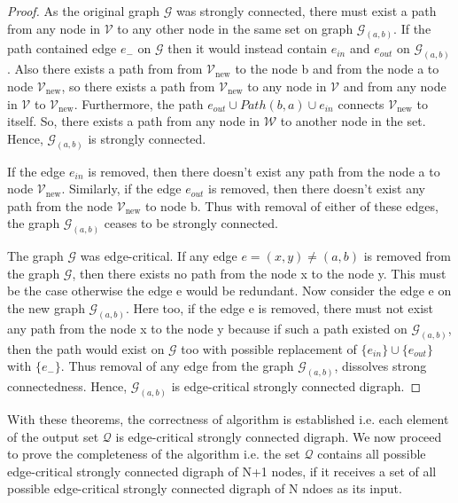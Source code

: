 \documentclass[runningheads]{llncs}
\begin{document}
\begin{proof}
As the original graph $\mathcal{G}$ was strongly connected, there must exist a path from any node in $\mathcal{V}$ to any other node in the same set on graph $\mathcal{G}_{(a, b)}$. If the path contained edge $e_{-}$ on $\mathcal{G}$ then it would instead contain $e_{in}$ and $e_{out}$ on $\mathcal{G}_{(a, b)}$. Also there exists a path from from $\mathcal{V}_{\text{new}}$ to the node b and from the node a to node $\mathcal{V}_{\text{new}}$, so there exists a path from $\mathcal{V}_{\text{new}}$ to any node in $\mathcal{V}$ and from any node in $\mathcal{V}$ to $\mathcal{V}_{\text{new}}$. Furthermore, the path $e_{out} \cup Path(b, a) \cup e_{in}$ connects $\mathcal{V}_{\text{new}}$ to itself. So, there exists a path from any node in $\mathcal{W}$ to another node in the set. Hence, $\mathcal{G}_{(a, b)}$ is strongly connected.

If the edge $e_{in}$ is removed, then there doesn't exist any path from the node a to node $\mathcal{V}_{\text{new}}$. Similarly, if the edge $e_{out}$ is removed, then there doesn't exist any path from the node $\mathcal{V}_{\text{new}}$ to node b. Thus with removal of either of these edges, the graph $\mathcal{G}_{(a, b)}$ ceases to be strongly connected. 

The graph $\mathcal{G}$ was edge-critical. If any edge $e = (x, y) \neq (a, b)$ is removed from the graph $\mathcal{G}$, then there exists no path from the node x to the node y. This must be the case otherwise the edge e would be redundant. Now consider the edge e on the new graph $\mathcal{G}_{(a, b)}$. Here too, if the edge e is removed, there must not exist any path from the node x to the node y because if such a path existed on $\mathcal{G}_{(a, b)}$, then the path would exist on $\mathcal{G}$ too with possible replacement of $\{e_{in}\} \cup \{e_{out}\}$ with $\{e_{-}\}$. Thus removal of any edge from the graph $\mathcal{G}_{(a, b)}$, dissolves strong connectedness. Hence, $\mathcal{G}_{(a, b)}$ is edge-critical strongly connected digraph.
\end{proof}

\noindent With these theorems, the correctness of algorithm is established i.e. each element of the output set $\mathcal{Q}$ is edge-critical strongly connected digraph. We now proceed to prove the completeness of the algorithm i.e. the set $\mathcal{Q}$ contains all possible edge-critical strongly connected digraph of N+1 nodes, if it receives a set of all possible edge-critical strongly connected digraph of N ndoes as its input.
\end{document}
